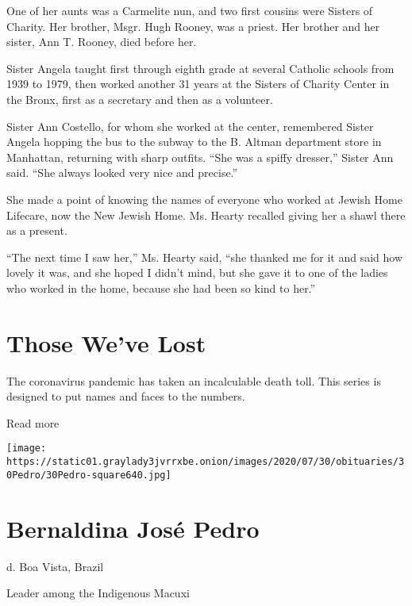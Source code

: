 One of her aunts was a Carmelite nun, and two first cousins were Sisters
of Charity. Her brother, Msgr. Hugh Rooney, was a priest. Her brother
and her sister, Ann T. Rooney, died before her.

Sister Angela taught first through eighth grade at several Catholic
schools from 1939 to 1979, then worked another 31 years at the Sisters
of Charity Center in the Bronx, first as a secretary and then as a
volunteer.

Sister Ann Costello, for whom she worked at the center, remembered
Sister Angela hopping the bus to the subway to the B. Altman department
store in Manhattan, returning with sharp outfits. ``She was a spiffy
dresser,'' Sister Ann said. ``She always looked very nice and precise.''

She made a point of knowing the names of everyone who worked at Jewish
Home Lifecare, now the New Jewish Home. Ms. Hearty recalled giving her a
shawl there as a present.

``The next time I saw her,'' Ms. Hearty said, ``she thanked me for it
and said how lovely it was, and she hoped I didn't mind, but she gave it
to one of the ladies who worked in the home, because she had been so
kind to her.''

\href{https://www.nytimes3xbfgragh.onion/interactive/2020/obituaries/people-died-coronavirus-obituaries.html?action=click\&pgtype=Article\&state=default\&region=BELOW_MAIN_CONTENT\&context=covid_obits_promo}{}

\hypertarget{those-weve-lost}{%
\section{Those We've Lost}\label{those-weve-lost}}

The coronavirus pandemic has taken an incalculable death toll. This
series is designed to put names and faces to the numbers.

Read more

\texttt{[image: https://static01.graylady3jvrrxbe.onion/images/2020/07/30/obituaries/30Pedro/30Pedro-square640.jpg]}

\hypertarget{bernaldina-josuxe9-pedro}{%
\section{Bernaldina José Pedro}\label{bernaldina-josuxe9-pedro}}

d. Boa Vista, Brazil

Leader among the Indigenous Macuxi

